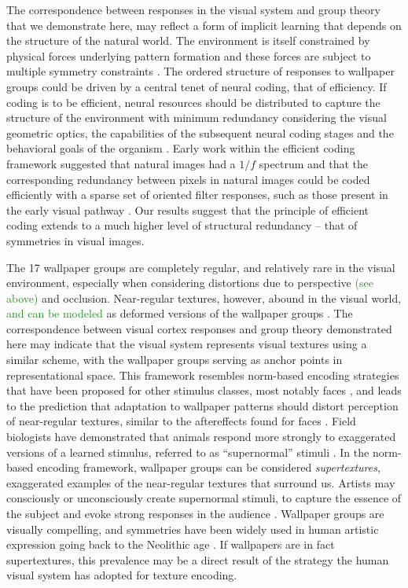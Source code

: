 \documentclass[11pt, twoside]{article}
\begin{document}
The correspondence between responses in the visual system and group theory that we demonstrate here, may reflect a form of implicit learning that depends on the structure of the natural world. The environment is itself constrained by physical forces underlying pattern formation and these forces are subject to multiple symmetry constraints \citep{RN1634}. The ordered structure of responses to wallpaper groups could be driven by a central tenet of neural coding, that of efficiency. If coding is to be efficient, neural resources should be distributed to capture the structure of the environment with minimum redundancy considering the visual geometric optics, the capabilities of the subsequent neural coding stages and the behavioral goals of the organism \citep{RN1758, RN1760, RN1757, RN1756}. Early work within the efficient coding framework suggested that natural images had a $1/f$ spectrum and that the corresponding redundancy between pixels in natural images could be coded efficiently with a sparse set of oriented filter responses, such as those present in the early visual pathway \citep{RN1740, RN1446}. Our results suggest that the principle of efficient coding extends to a much higher level of structural redundancy – that of symmetries in visual images. 

The 17 wallpaper groups are completely regular, and relatively rare in the visual environment, especially when considering distortions due to perspective \textcolor{ForestGreen}{(see above)} and occlusion. Near-regular textures, however, abound in the visual world, \textcolor{ForestGreen}{and can be modeled} as deformed versions of the wallpaper groups \citep{RN1519}. The correspondence between visual cortex responses and group theory demonstrated here may indicate that the visual system represents visual textures using a similar scheme, with the wallpaper groups serving as anchor points in representational space. This framework resembles norm-based encoding strategies that have been proposed for other stimulus classes, most notably faces \citep{RN435}, and leads to the prediction that adaptation to wallpaper patterns should distort perception of near-regular textures, similar to the aftereffects found for faces \citep{RN1768}. Field biologists have demonstrated that animals respond more strongly to exaggerated versions of a learned stimulus, referred to as “supernormal” stimuli \citep{RN1775}. In the norm-based encoding framework, wallpaper groups can be considered \textit{supertextures}, exaggerated examples of the near-regular textures that surround us. Artists may consciously or unconsciously create supernormal stimuli, to capture the essence of the subject and evoke strong responses in the audience \citep{RN1764}. Wallpaper groups are visually compelling, and symmetries have been widely used in human artistic expression going back to the Neolithic age \citep{RN1949}. If wallpapers are in fact supertextures, this prevalence may be a direct result of the strategy the human visual system has adopted for texture encoding. 
\end{document}
